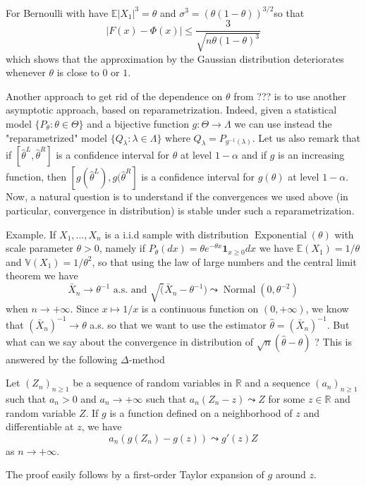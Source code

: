 \documentclass[
	fontsize=11pt, %
	twoside=false, %
	numbers=noenddot, %
]{kaobook}
\DeclareMathOperator{\nor}{Normal}
\DeclareMathOperator{\expo}{Exponential}
\newcommand{\E}{\mathbb E}
\newcommand{\R}{\mathbb R}
\newcommand{\var}{\mathbb V}
\newcommand{\wh}{\widehat}
\newcommand{\ind}[1]{\mathbf 1_{#1}}
\newcommand{\goes}{\rightarrow}
\begin{document}
For Bernoulli with have $\E|X_1|^3 = \theta$ and $\sigma^3 = (\theta(1 - \theta))^{3/2}$so that 
\begin{equation*}
	|F(x) - \Phi(x)| \leq \frac{3}{\sqrt{n \theta (1 - \theta)^3}}
\end{equation*}
which shows that the approximation by the Gaussian distribution deteriorates whenever $\theta$ is close to $0$ or $1$.



Another approach to get rid of the dependence on $\theta$ from ??? is to use another asymptotic approach, based on reparametrization.
Indeed, given a statistical model $\{ P_\theta : \theta \in \Theta \}$ and a bijective function $g : \Theta \goes \Lambda$ we can use instead the "reparametrized" model $\{ Q_\lambda : \lambda \in \Lambda \}$ where $Q_\lambda = P_{g^{-1}(\lambda)}$.
Let us also remark that if $[\wh \theta^L, \wh \theta^R]$ is a confidence interval for $\theta$ at level $1 - \alpha$ and if $g$ is an increasing function, then 
$[g(\wh \theta^L), g(\wh \theta^R]$ is a confidence interval for $g(\theta)$ at level $1 - \alpha$.
Now, a natural question is to understand if the convergences we used above (in particular, convergence in distribution) is stable under such a reparametrization.

Example. If $X_1, \ldots, X_n$ is a i.i.d sample with distribution $\expo(\theta)$ with scale parameter $\theta > 0$, namely if $P_\theta(dx) = \theta e^{-\theta x} \ind{x \geq 0} dx$ we have $\E(X_1) = 1 / \theta$ and $\var(X_1) = 1 / \theta^2$, so that using the law of large numbers and the central limit theorem we have
\begin{equation*}
	\bar X_n \rightarrow \theta^{-1} \text{ a.s.  and } \sqrt (\bar X_n - \theta^{-1}) \leadsto \nor(0, \theta^{-2})
\end{equation*}
when $n \rightarrow +\infty$.
Since $x \mapsto 1 / x$ is a continuous function on $(0, +\infty)$, we know that $(\bar X_n)^{-1} \goes \theta$ a.s. so that we want to use the estimator $\wh \theta = (\bar X_n)^{-1}$.
But what can we say about the convergence in distribution of $\sqrt n (\wh \theta - \theta)$ ?
This is answered by the following $\Delta$-method
\begin{theorem}
	\label{thm:delta-method}
 	Let $(Z_n)_{n \geq 1}$ be a sequence of random variables in $\R$ and a sequence $(a_n)_{n \geq 1}$ such that $a_n > 0$ and $a_n \goes +\infty$ such that $a_n(Z_n - z) \leadsto Z$ for some $z \in \R$ and random variable $Z$.
 	If $g$ is a function defined on a neighborhood of $z$ and differentiable at $z$, we have 
 	\begin{equation}
 		a_n (g(Z_n) - g(z)) \leadsto g'(z) Z
 	\end{equation}
 	as $n \goes +\infty$.
\end{theorem}
The proof easily follows by a first-order Taylor expansion of $g$ around $z$.
\end{document}
